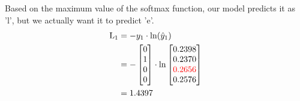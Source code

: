 \documentclass{article}
\begin{document}
Based on the maximum value of the softmax function, our model predicts it as 'l', but we actually want it to predict 'e'.
\begin{align*}
    \text{L}_{1} & = -y_1 \cdot \ln(\hat{y}_1) \\
    &=-\begin{bmatrix} 0 \\ 1 \\ 0 \\ 0 \end{bmatrix} \cdot \ln{\begin{bmatrix} 0.2398 \\ 0.2370 \\ \textcolor{red}{0.2656} \\ 0.2576 \end{bmatrix}}\\
    &=1.4397
\end{align*}
\end{document}
